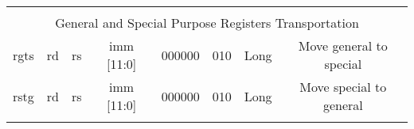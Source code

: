 \documentclass{article}
\begin{document}
\begin{center}
\begin{longtable}{|c|l|r|l|r|l|r|l|r|l|r|c|c|}
    
    \hline              \multicolumn{13}{|c|}{} \\
    
                        \multicolumn{13}{|c|}{General and Special Purpose Registers Transportation} \\
    \hline rgts     &   \multicolumn{2}{|c|}{rd}    &   \multicolumn{2}{|c|}{rs}    &   \multicolumn{2}{|c|}{imm [11:0]}    &   \multicolumn{2}{|c|}{000000}    &   \multicolumn{2}{|c|}{010}   &   Long    &   Move general to special \\
    \hline rstg     &   \multicolumn{2}{|c|}{rd}    &   \multicolumn{2}{|c|}{rs}    &   \multicolumn{2}{|c|}{imm [11:0]}    &   \multicolumn{2}{|c|}{000000}    &   \multicolumn{2}{|c|}{010}   &   Long    &   Move special to general \\
    
    
    \hline              \multicolumn{13}{|c|}{} \\
    

\end{longtable}
\end{center}
\end{document}
